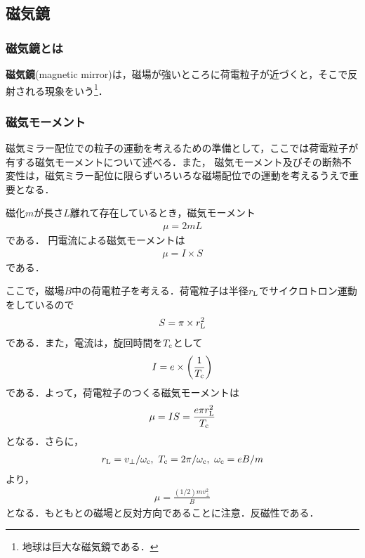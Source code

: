 \documentclass{report}
\begin{document}
    \subsection{磁気鏡}
      \subsubsection{磁気鏡とは}
        \textbf{磁気鏡}(magnetic mirror)は，磁場が強いところに荷電粒子が近づくと，そこで反射される現象をいう\footnote{地球は巨大な磁気鏡である．}．

      \subsubsection{磁気モーメント}
        磁気ミラー配位での粒子の運動を考えるための準備として，ここでは荷電粒子が有する磁気モーメントについて述べる．また，
        磁気モーメント及びその断熱不変性は，磁気ミラー配位に限らずいろいろな磁場配位での運動を考えるうえで重要となる．

        磁化$m$が長さ$L$離れて存在しているとき，磁気モーメント
        \begin{align}
          \mu = 2mL
        \end{align}
        である．
        円電流による磁気モーメントは
        \begin{align}
          \mu = I \times S
        \end{align}
        である．

        ここで，磁場$B$中の荷電粒子を考える．荷電粒子は半径$r_{\mathrm{L}}$でサイクロトロン運動をしているので
        \begin{align}
          S = \pi \times r_{\mathrm{L}}^2
        \end{align}
        である．また，電流は，旋回時間を$T_{\mathrm{c}}$として
        \begin{align}
          I = e \times \qty(\frac{1}{T_{\mathrm{c}}})
        \end{align}
        である．よって，荷電粒子のつくる磁気モーメントは
        \begin{align}
          \mu = IS = \frac{e\pi r_{\mathrm{L}}^2}{T_{\mathrm{c}}}
        \end{align}
        となる．さらに，
        \begin{align}
          r_{\mathrm{L}} = v_{\perp} / \omega_{\mathrm{c}},\ T_{\mathrm{c}} = 2\pi / \omega_{\mathrm{c}},\ \omega_{\mathrm{c}} = eB/m
        \end{align}
        より，
        \begin{align}
          \mu = \frac{(1/2)mv_{\perp}^2}{B} \label{magnetic-moment}
        \end{align}
        となる．もともとの磁場と反対方向であることに注意．反磁性である．
\end{document}
